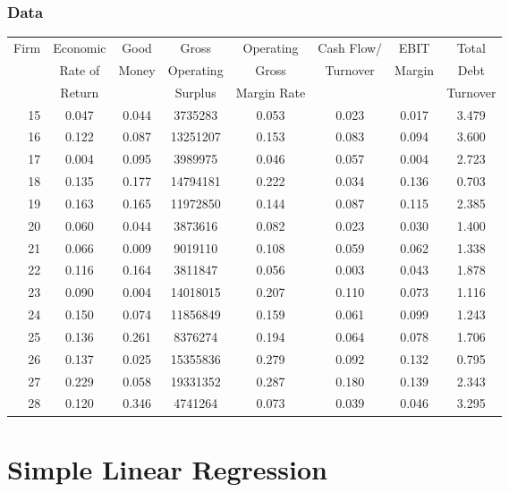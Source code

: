 \documentclass[12pt]{beamer}
\begin{document}
\begin{frame}
\frametitle{Data}
\begin{center}
\renewcommand{\arraystretch}{1.1}
{\tiny
\begin{tabular}{|r|c|c|c|c|c|c|c|}
\hline
\multirow{3}{*}{Firm} & Economic & Good  & Gross & Operating & Cash Flow/ & EBIT & Total\\
 & Rate of & Money & Operating & Gross & Turnover & Margin & Debt\\
 & Return & & Surplus & Margin Rate & & & Turnover\\
\hline
15 & 0.047 & 0.044 & 3735283  & 0.053 & 0.023 & 0.017 & 3.479 \\ \hline
16 & 0.122 & 0.087 & 13251207 & 0.153 & 0.083 & 0.094 & 3.600 \\ \hline
17 & 0.004 & 0.095 & 3989975  & 0.046 & 0.057 & 0.004 & 2.723 \\ \hline
18 & 0.135 & 0.177 & 14794181 & 0.222 & 0.034 & 0.136 & 0.703 \\ \hline
19 & 0.163 & 0.165 & 11972850 & 0.144 & 0.087 & 0.115 & 2.385 \\ \hline
20 & 0.060 & 0.044 & 3873616  & 0.082 & 0.023 & 0.030 & 1.400 \\ \hline
21 & 0.066 & 0.009 & 9019110  & 0.108 & 0.059 & 0.062 & 1.338 \\ \hline
22 & 0.116 & 0.164 & 3811847  & 0.056 & 0.003 & 0.043 & 1.878 \\ \hline
23 & 0.090 & 0.004 & 14018015 & 0.207 & 0.110 & 0.073 & 1.116 \\ \hline
24 & 0.150 & 0.074 & 11856849 & 0.159 & 0.061 & 0.099 & 1.243 \\ \hline
25 & 0.136 & 0.261 & 8376274  & 0.194 & 0.064 & 0.078 & 1.706 \\ \hline
26 & 0.137 & 0.025 & 15355836 & 0.279 & 0.092 & 0.132 & 0.795 \\ \hline
27 & 0.229 & 0.058 & 19331352 & 0.287 & 0.180 & 0.139 & 2.343 \\ \hline
28 & 0.120 & 0.346 & 4741264  & 0.073 & 0.039 & 0.046 & 3.295 \\ \hline
\end{tabular}}
\end{center}
\end{frame}

\section{Simple Linear Regression}
\end{document}
